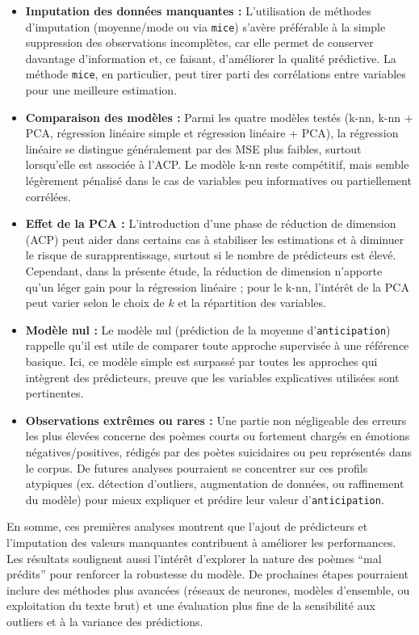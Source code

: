 \documentclass[11pt]{article}
\begin{document}
\begin{itemize}
	\item \textbf{Imputation des données manquantes :} 
	L’utilisation de méthodes d’imputation (moyenne/mode ou via \texttt{mice}) s’avère préférable à la simple suppression des observations incomplètes, car elle permet de conserver davantage d’information et, ce faisant, d’améliorer la qualité prédictive. La méthode \texttt{mice}, en particulier, peut tirer parti des corrélations entre variables pour une meilleure estimation.
	
	\item \textbf{Comparaison des modèles :} 
	Parmi les quatre modèles testés (k-nn, k-nn + PCA, régression linéaire simple et régression linéaire + PCA), la régression linéaire se distingue généralement par des MSE plus faibles, surtout lorsqu’elle est associée à l’ACP. Le modèle k-nn reste compétitif, mais semble légèrement pénalisé dans le cas de variables peu informatives ou partiellement corrélées.
	
	\item \textbf{Effet de la PCA :} 
	L’introduction d’une phase de réduction de dimension (ACP) peut aider dans certains cas à stabiliser les estimations et à diminuer le risque de surapprentissage, surtout si le nombre de prédicteurs est élevé. Cependant, dans la présente étude, la réduction de dimension n’apporte qu’un léger gain pour la régression linéaire ; pour le k-nn, l’intérêt de la PCA peut varier selon le choix de \(k\) et la répartition des variables.
	
	\item \textbf{Modèle nul :} 
	Le modèle nul (prédiction de la moyenne d’\texttt{anticipation}) rappelle qu’il est utile de comparer toute approche supervisée à une référence basique. Ici, ce modèle simple est surpassé par toutes les approches qui intègrent des prédicteurs, preuve que les variables explicatives utilisées sont pertinentes.
	
	\item \textbf{Observations extrêmes ou rares :} 
	Une partie non négligeable des erreurs les plus élevées concerne des poèmes courts ou fortement chargés en émotions négatives/positives, rédigés par des poètes suicidaires ou peu représentés dans le corpus. De futures analyses pourraient se concentrer sur ces profils atypiques (ex. détection d’outliers, augmentation de données, ou raffinement du modèle) pour mieux expliquer et prédire leur valeur d’\texttt{anticipation}.
\end{itemize}

En somme, ces premières analyses montrent que l’ajout de prédicteurs et l’imputation des valeurs manquantes contribuent à améliorer les performances. Les résultats soulignent aussi l’intérêt d’explorer la nature des poèmes “mal prédits” pour renforcer la robustesse du modèle. De prochaines étapes pourraient inclure des méthodes plus avancées (réseaux de neurones, modèles d’ensemble, ou exploitation du texte brut) et une évaluation plus fine de la sensibilité aux outliers et à la variance des prédictions. 

	
	
\end{document}
